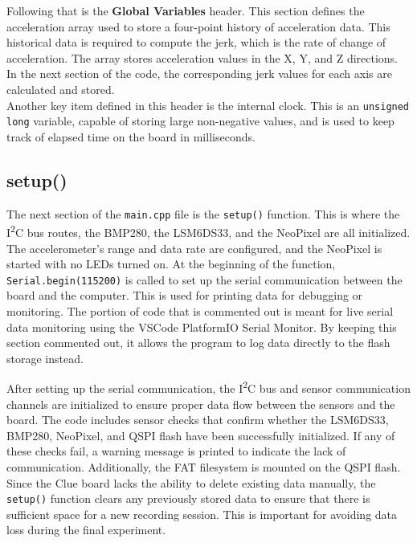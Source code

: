 \documentclass[12pt]{report}
\begin{document}
Following that is the \textbf{Global Variables} header. This section defines the acceleration array used to store a four-point history of acceleration data. This historical data is required to compute the jerk, which is the rate of change of acceleration. The array stores acceleration values in the X, Y, and Z directions. In the next section of the code, the corresponding jerk values for each axis are calculated and stored. \\

Another key item defined in this header is the internal clock. This is an \texttt{unsigned long} variable, capable of storing large non-negative values, and is used to keep track of elapsed time on the board in milliseconds. \\

\subsection*{setup()}

The next section of the \texttt{main.cpp} file is the \texttt{setup()} function. This is where the I\textsuperscript{2}C bus routes, the BMP280, the LSM6DS33, and the NeoPixel are all initialized. The accelerometer's range and data rate are configured, and the NeoPixel is started with no LEDs turned on. At the beginning of the function, \texttt{Serial.begin(115200)} is called to set up the serial communication between the board and the computer. This is used for printing data for debugging or monitoring. The portion of code that is commented out is meant for live serial data monitoring using the VSCode PlatformIO Serial Monitor. By keeping this section commented out, it allows the program to log data directly to the flash storage instead. \newline

After setting up the serial communication, the I\textsuperscript{2}C bus and sensor communication channels are initialized to ensure proper data flow between the sensors and the board. The code includes sensor checks that confirm whether the LSM6DS33, BMP280, NeoPixel, and QSPI flash have been successfully initialized. If any of these checks fail, a warning message is printed to indicate the lack of communication. Additionally, the FAT filesystem is mounted on the QSPI flash. Since the Clue board lacks the ability to delete existing data manually, the \texttt{setup()} function clears any previously stored data to ensure that there is sufficient space for a new recording session. This is important for avoiding data loss during the final experiment. \newline
\end{document}
